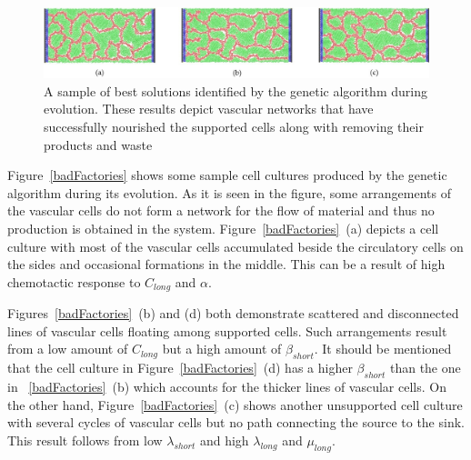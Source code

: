 \begin{figure}[ht]
    \begin{center}
        \includegraphics[width=\textwidth]{./results/good factories.jpg}
    \end{center}
    \caption{A sample of best solutions identified by the genetic algorithm during
    evolution. These results depict vascular networks that have successfully
    nourished the supported cells along with removing their products and waste}
    \label{goodFactories}
\end{figure}

Figure~\ref{badFactories} shows some sample cell cultures produced by the genetic
algorithm during its evolution. As it is seen in the figure, some arrangements of the
vascular cells do not form a network for the flow of material and thus no production
is obtained in the system. Figure~\ref{badFactories}~(a) depicts a cell culture with
most of the vascular cells accumulated beside the circulatory cells on the sides and
occasional formations in the middle. This can be a result of high chemotactic
response to $C_{long}$ and $\alpha$.

Figures~\ref{badFactories}~(b) and (d) both demonstrate scattered and disconnected
lines of vascular cells floating among supported cells. Such arrangements result from
a low amount of $C_{long}$ but a high amount of $\beta_{short}$. It should be
mentioned that the cell culture in Figure~\ref{badFactories}~(d) has a higher
$\beta_{short}$ than the one in ~\ref{badFactories}~(b) which accounts for the
thicker lines of vascular cells. On the other hand, Figure~\ref{badFactories}~(c)
shows another unsupported cell culture with several cycles of vascular cells but no
path connecting the source to the sink. This result follows from low
$\lambda_{short}$ and high $\lambda_{long}$ and $\mu_{long}$.

